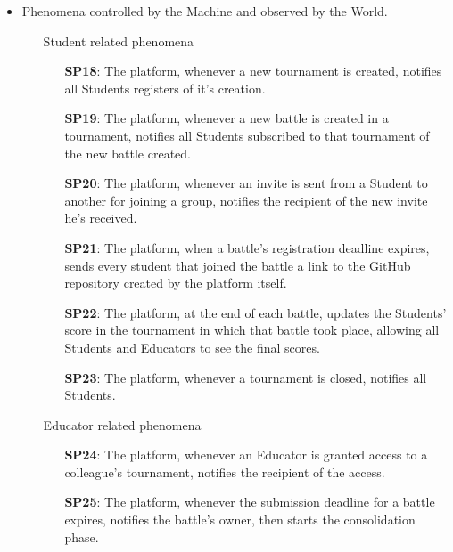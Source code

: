 \documentclass{article}
\begin{document}
\begin{itemize}
    \item Phenomena controlled by the Machine and observed by the World.
          \begin{enumerate}
              \item[\ding{228}] Student related phenomena
                    \begin{enumerate}
                        \item[\textbf{SP18}:] The platform, whenever a new tournament is created, notifies all Students registers of it's creation.
                        \item[\textbf{SP19}:] The platform, whenever a new battle is created in a tournament, notifies all Students subscribed to that 
                        tournament of the new battle created.
                        \item[\textbf{SP20}:] The platform, whenever an invite is sent from a Student to another for joining a group, notifies the recipient 
                        of the new invite he's received.
                        \item[\textbf{SP21}:] The platform, when a battle's registration deadline expires, sends every student that
                         joined the battle a link to the GitHub repository created by the platform itself.
                        \item[\textbf{SP22}:] The platform, at the end of each battle, updates the Students' score in the tournament in
                         which that battle took place, allowing all Students and Educators to see the final scores.
                        \item[\textbf{SP23}:] The platform, whenever a tournament is closed, notifies all Students.
                    \end{enumerate}
              \item[\ding{228}] Educator related phenomena
                    \begin{enumerate}
                        \item[\textbf{SP24}:] The platform, whenever an Educator is granted access to a colleague's tournament, notifies the recipient of the access.
                        \item[\textbf{SP25}:] The platform, whenever the submission deadline for a battle expires, notifies the battle's owner, then starts the
                         consolidation phase.
                    \end{enumerate}
          \end{enumerate}
\end{itemize}
\end{document}
